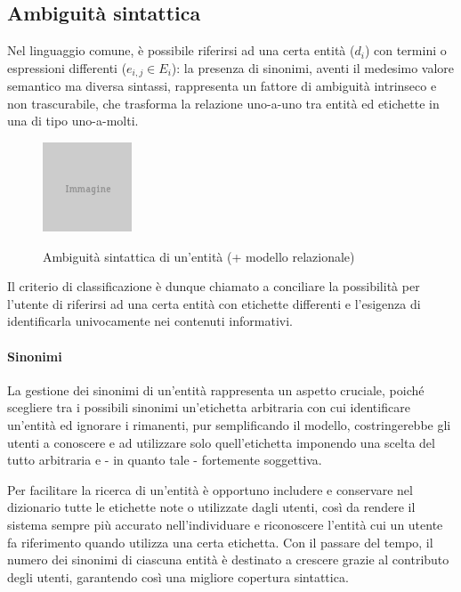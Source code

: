 \subsection{Ambiguità sintattica}
\label{sec:tesi:stage:criterio-classificazione_ambiguità-sintattica}
Nel linguaggio comune, è possibile riferirsi ad una certa entità ($d_i$) con termini o espressioni differenti ($e_{i,j} \in E_i$): la presenza di sinonimi, aventi il medesimo valore semantico ma diversa sintassi, rappresenta un fattore di ambiguità intrinseco e non trascurabile, che trasforma la relazione uno-a-uno tra entità ed etichette in una di tipo uno-a-molti.

\begin{figure}[ht]
	\begin{center}
		\includegraphics{placeholder.png}
		\label{fig:tesi:stage:fase-uno:ambiguita-sintattica}
		\caption{Ambiguità sintattica di un'entità (+ modello relazionale)}
	\end{center}
\end{figure}

Il criterio di classificazione è dunque chiamato a conciliare la possibilità per l'utente di riferirsi ad una certa entità con etichette differenti e l'esigenza di identificarla univocamente nei contenuti informativi.

\paragraph{Sinonimi}
La gestione dei sinonimi di un'entità rappresenta un aspetto cruciale, poiché scegliere tra i possibili sinonimi un'etichetta arbitraria con cui identificare un'entità ed ignorare i rimanenti, pur semplificando il modello, costringerebbe gli utenti a conoscere e ad utilizzare solo quell'etichetta imponendo una scelta del tutto arbitraria e - in quanto tale - fortemente soggettiva.

Per facilitare la ricerca di un'entità è opportuno includere e conservare nel dizionario tutte le etichette note o utilizzate dagli utenti, così da rendere il sistema sempre più accurato nell'individuare e riconoscere l'entità cui un utente fa riferimento quando utilizza una certa etichetta. Con il passare del tempo, il numero dei sinonimi di ciascuna entità è destinato a crescere grazie al contributo degli utenti, garantendo così una migliore copertura sintattica.

